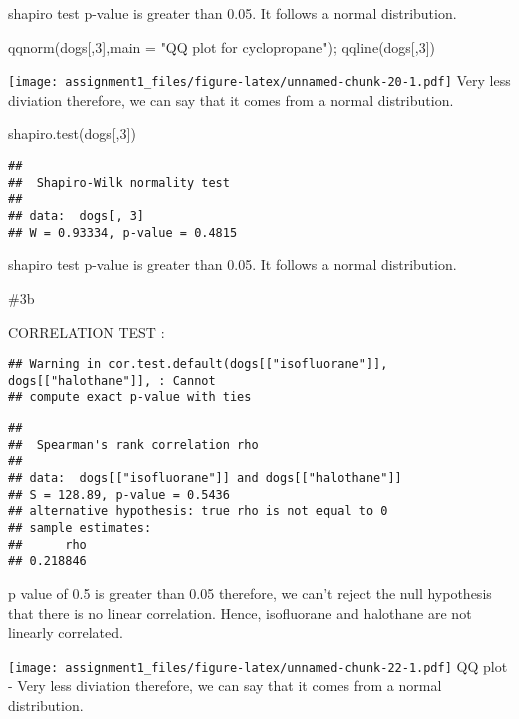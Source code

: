 \documentclass[
]{article}
\newenvironment{Shaded}{\begin{snugshade}}{\end{snugshade}}
\newcommand{\AttributeTok}[1]{\textcolor[rgb]{0.77,0.63,0.00}{#1}}
\newcommand{\DecValTok}[1]{\textcolor[rgb]{0.00,0.00,0.81}{#1}}
\newcommand{\FunctionTok}[1]{\textcolor[rgb]{0.00,0.00,0.00}{#1}}
\newcommand{\NormalTok}[1]{#1}
\newcommand{\StringTok}[1]{\textcolor[rgb]{0.31,0.60,0.02}{#1}}
\begin{document}
shapiro test p-value is greater than 0.05. It follows a normal
distribution.

\begin{Shaded}
\begin{Highlighting}[]
\FunctionTok{qqnorm}\NormalTok{(dogs[,}\DecValTok{3}\NormalTok{],}\AttributeTok{main =} \StringTok{"QQ plot for cyclopropane"}\NormalTok{); }\FunctionTok{qqline}\NormalTok{(dogs[,}\DecValTok{3}\NormalTok{])}
\end{Highlighting}
\end{Shaded}

\texttt{[image: assignment1\_files/figure-latex/unnamed-chunk-20-1.pdf]}
Very less diviation therefore, we can say that it comes from a normal
distribution.

\begin{Shaded}
\begin{Highlighting}[]
\FunctionTok{shapiro.test}\NormalTok{(dogs[,}\DecValTok{3}\NormalTok{])}
\end{Highlighting}
\end{Shaded}

\begin{verbatim}
## 
##  Shapiro-Wilk normality test
## 
## data:  dogs[, 3]
## W = 0.93334, p-value = 0.4815
\end{verbatim}

shapiro test p-value is greater than 0.05. It follows a normal
distribution.

\#3b

CORRELATION TEST :

\begin{verbatim}
## Warning in cor.test.default(dogs[["isofluorane"]], dogs[["halothane"]], : Cannot
## compute exact p-value with ties
\end{verbatim}

\begin{verbatim}
## 
##  Spearman's rank correlation rho
## 
## data:  dogs[["isofluorane"]] and dogs[["halothane"]]
## S = 128.89, p-value = 0.5436
## alternative hypothesis: true rho is not equal to 0
## sample estimates:
##      rho 
## 0.218846
\end{verbatim}

p value of 0.5 is greater than 0.05 therefore, we can't reject the null
hypothesis that there is no linear correlation. Hence, isofluorane and
halothane are not linearly correlated.

\texttt{[image: assignment1\_files/figure-latex/unnamed-chunk-22-1.pdf]}
QQ plot - Very less diviation therefore, we can say that it comes from a
normal distribution.
\end{document}
